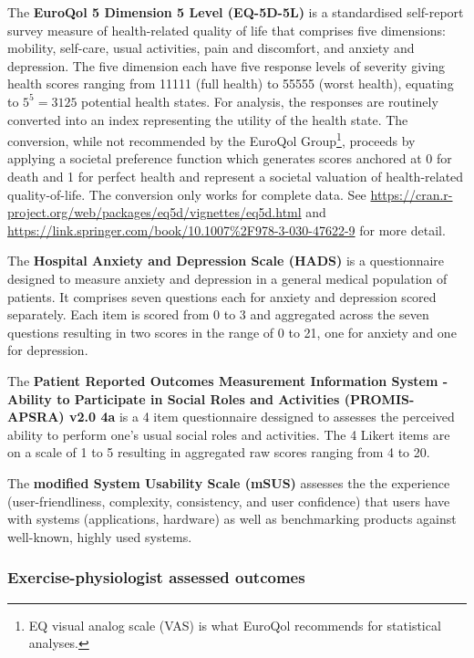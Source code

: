\documentclass[
]{article}
\begin{document}
\label{outcome:eq5d5l}
The \textbf{EuroQol 5 Dimension 5 Level (EQ-5D-5L)} is a standardised self-report survey measure of health-related quality of life that comprises five dimensions: mobility, self-care, usual activities, pain and discomfort, and anxiety and depression.
The five dimension each have five response levels of severity giving health scores ranging from 11111 (full health) to 55555 (worst health), equating to $5^5 = 3125$ potential health states.
For analysis, the responses are routinely converted into an index representing the utility of the health state.
The conversion, while not recommended by the EuroQol Group\footnote{EQ visual analog scale (VAS) is what EuroQol recommends for statistical analyses.}, proceeds by applying a societal preference function which generates scores anchored at 0 for death and 1 for perfect health and represent a societal valuation of health-related quality-of-life.
The conversion only works for complete data.
See \url{https://cran.r-project.org/web/packages/eq5d/vignettes/eq5d.html} and \url{https://link.springer.com/book/10.1007\%2F978-3-030-47622-9} for more detail.

\label{outcome:hads}
The \textbf{Hospital Anxiety and Depression Scale (HADS)} \cite{zigmond1983hospital} is a questionnaire designed to measure anxiety and depression in a general medical population of patients.
It comprises seven questions each for anxiety and depression scored separately.
Each item is scored from 0 to 3 and aggregated across the seven questions resulting in two scores in the range of 0 to 21, one for anxiety and one for depression.

\label{outcome:promis-apsra}
The \textbf{Patient Reported Outcomes Measurement Information System - Ability to Participate in Social Roles and Activities (PROMIS-APSRA) v2.0 4a} \cite{cella2019promis} is a 4 item questionnaire dessigned to assesses the perceived ability to perform one’s usual social roles and activities.
The 4 Likert items are on a scale of 1 to 5 resulting in aggregated raw scores ranging from 4 to 20.

\label{outcome:msus}
The \textbf{modified System Usability Scale (mSUS)} assesses the the experience (user-friendliness, complexity, consistency, and user confidence) that users have with systems (applications, hardware) as well as benchmarking products against well-known, highly used systems.

\hypertarget{epa-outcomes}{
  \subsubsection{Exercise-physiologist assessed outcomes}\label{epa-outcomes}}
\end{document}
